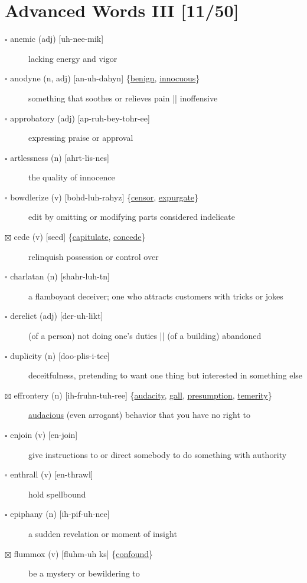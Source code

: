\documentclass[11pt]{article}
\begin{document}
\section{Advanced Words III [11/50]}
\label{sec:org4d9f522}
\begin{description}
\item[{$\square$ anemic (adj) [uh-nee-mik]}] lacking energy and vigor
\item[{$\square$ \label{orgf23f0a8}anodyne (n, adj) [an-uh-dahyn] \{\hyperref[org0405622]{benign}, \hyperref[org773281e]{innocuous}\}}] something that soothes or relieves pain || inoffensive
\item[{$\square$ approbatory (adj) [ap-ruh-bey-tohr-ee]}] expressing praise or approval
\item[{$\square$ artlessness (n) [ahrt-lis-nes]}] the quality of innocence
\item[{$\square$ \label{org5c645ad}bowdlerize (v) [bohd-luh-rahyz] \{\hyperref[org3a963c4]{censor}, \hyperref[orgdf717a8]{expurgate}\}}] edit by omitting or modifying parts considered indelicate
\item[{$\boxtimes$ \label{orgd728c67}cede (v) [seed] \{\hyperref[org17c47ed]{capitulate}, \hyperref[orgb17c891]{concede}\}}] relinquish possession or control over
\item[{$\square$ charlatan (n) [shahr-luh-tn]}] a flamboyant deceiver; one who attracts customers with tricks or jokes
\item[{$\square$ derelict (adj) [der-uh-likt]}] (of a person) not doing one's duties || (of a building) abandoned
\item[{$\square$ duplicity (n) [doo-plis-i-tee]}] deceitfulness, pretending to want one thing but interested in something else
\item[{$\boxtimes$ \label{orgfd36353}effrontery (n) [ih-fruhn-tuh-ree] \{\hyperref[org67e3069]{audacity}, \hyperref[orge1299c1]{gall}, \hyperref[org8e41497]{presumption}, \hyperref[org0f0706a]{temerity}\}}] \hyperref[org075f98a]{audacious} (even arrogant) behavior that you have no right to
\item[{$\square$ enjoin (v) [en-join]}] give instructions to or direct somebody to do something with authority
\item[{$\square$ enthrall (v) [en-thrawl]}] hold spellbound
\item[{$\square$ epiphany (n) [ih-pif-uh-nee]}] a sudden revelation or moment of insight
\item[{$\boxtimes$ \label{orgcdc7854}flummox (v) [fluhm-uh ks] \{\hyperref[org6671323]{confound}\}}] be a mystery or bewildering to

\end{description}
\end{document}
